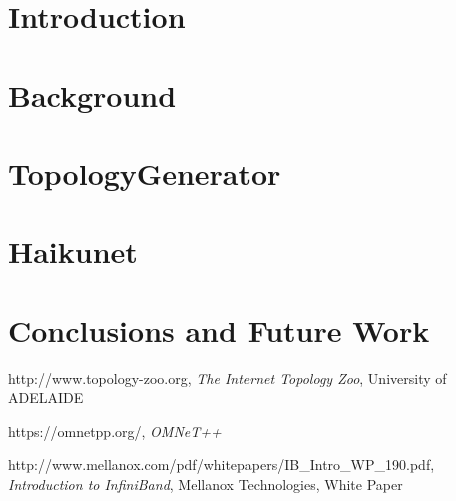\documentclass[11pt,a4paper,twoside]{tesis}
\begin{document}
\def\titulo{Licenciado }

\def\autor{Andrés Laurito}
\def\tituloTesis{Haikunet: \mbox{SDN programming language}}
\def\runtitulo{Haikunet: a SDN programming language for debugging the network}
\def\runtitle{Haikunet: SDN programming language}
\def\director{Hernán Melgratti}
\def\codirector{Rodrigo Castro}
\def\lugar{Buenos Aires, 2017}


\frontmatter
\pagestyle{empty}


\cleardoublepage


\cleardoublepage


\cleardoublepage


\cleardoublepage

\renewcommand*\contentsname{Summary}

\tableofcontents

\mainmatter
\pagestyle{headings}


\chapter{Introduction}


\chapter{Background}


\chapter{TopologyGenerator}


\chapter{Haikunet}


\chapter{Conclusions and Future Work}


\backmatter

\begin{thebibliography}{9}
http://www.topology-zoo.org, \textit{The Internet Topology Zoo}, University of ADELAIDE 

https://omnetpp.org/, \textit{OMNeT++}

http://www.mellanox.com/pdf/whitepapers/IB\_Intro\_WP\_190.pdf, \textit{Introduction to InfiniBand}, Mellanox Technologies, White Paper


\end{thebibliography}
\end{document}
